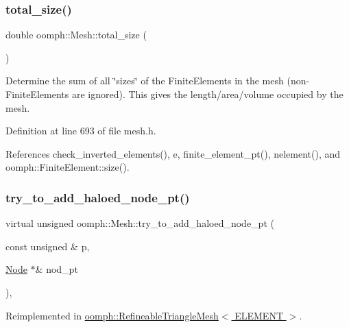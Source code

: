 \subsubsection{\texorpdfstring{total\+\_\+size()}{total\_size()}}
{\footnotesize\ttfamily double oomph\+::\+Mesh\+::total\+\_\+size (\begin{DoxyParamCaption}{ }\end{DoxyParamCaption})\hspace{0.3cm}{\ttfamily [inline]}}



Determine the sum of all \char`\"{}sizes\char`\"{} of the Finite\+Elements in the mesh (non-\/\+Finite\+Elements are ignored). This gives the length/area/volume occupied by the mesh. 



Definition at line 693 of file mesh.\+h.



References check\+\_\+inverted\+\_\+elements(), e, finite\+\_\+element\+\_\+pt(), nelement(), and oomph\+::\+Finite\+Element\+::size().

\mbox{\label{classoomph_1_1Mesh_a261da18d83f808fdf62b8f3c127266b1}} 
\subsubsection{\texorpdfstring{try\+\_\+to\+\_\+add\+\_\+haloed\+\_\+node\+\_\+pt()}{try\_to\_add\_haloed\_node\_pt()}}
{\footnotesize\ttfamily virtual unsigned oomph\+::\+Mesh\+::try\+\_\+to\+\_\+add\+\_\+haloed\+\_\+node\+\_\+pt (\begin{DoxyParamCaption}\item[{const unsigned \&}]{p,  }\item[{\hyperlink{classoomph_1_1Node}{Node} $\ast$\&}]{nod\+\_\+pt }\end{DoxyParamCaption})\hspace{0.3cm}{\ttfamily [inline]}, {\ttfamily [virtual]}}



Reimplemented in \hyperlink{classoomph_1_1RefineableTriangleMesh_a0bc1283a0cf4ea45abefea1930ef748a}{oomph\+::\+Refineable\+Triangle\+Mesh$<$ E\+L\+E\+M\+E\+N\+T $>$}.



